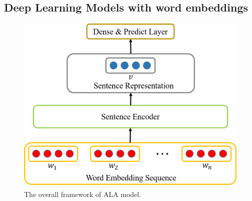 \documentclass[11pt,a4paper]{article}
\begin{document}
\subsection{Deep Learning Models with word embeddings\label{dl models}}
\begin{figure}
\centering
\includegraphics[scale=0.3]{framework.png}
\caption{The overall framework of ALA model.}
\label{framework}
\end{figure}
\end{document}
